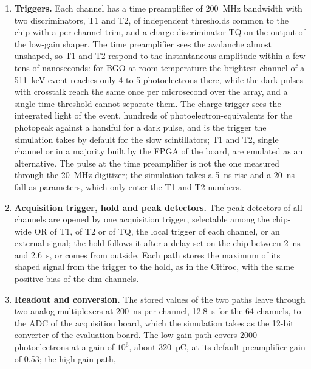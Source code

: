 \documentclass[11pt]{article}
\newcommand{\us}{\textmu s\xspace}
\begin{document}
\begin{enumerate}
  neither the capacitance nor the shaping time attached, allows up to
  about 0.7 photoelectron once scaled to the 2~nF of our device. The
  simulation assumes 0.1 photoelectron rms at 100~ns, scaled as
  $(100~\mathrm{ns}/t_p)^{1/2}$, until the bench measures it; the dark
  pulses, which the model generates explicitly, grow instead with the
  peaking time.
\item {\bf Triggers.} Each channel has a time preamplifier of 200~MHz
  bandwidth with two discriminators, T1 and T2, of independent thresholds
  common to the chip with a per-channel trim, and a charge discriminator TQ
  on the output of the low-gain shaper. The time preamplifier sees the
  avalanche almost unshaped, so T1 and T2 respond to the instantaneous
  amplitude within a few tens of nanoseconds: for BGO at room temperature the brightest
  channel of a 511~keV event reaches only 4 to 5 photoelectrons there,
  while the dark pulses with crosstalk reach the same once per microsecond
  over the array, and a single time threshold cannot separate them. The
  charge trigger sees the integrated light of the event, hundreds of
  photoelectron-equivalents for the photopeak against a handful for a dark
  pulse, and is the trigger the simulation takes by default for the slow
  scintillators; T1 and T2, single channel or in a majority built by the
  FPGA of the board, are emulated as an alternative. The pulse at the time
  preamplifier is not the one measured through the 20~MHz digitizer; the
  simulation takes a 5~ns rise and a 20~ns fall as parameters, which only
  enter the T1 and T2 numbers.
\item {\bf Acquisition trigger, hold and peak detectors.} The peak detectors
  of all channels are opened by one acquisition trigger, selectable among the
  chip-wide OR of T1, of T2 or of TQ, the local trigger of each channel, or
  an external signal; the hold follows it after a delay set on the chip
  between 2~ns and 2.6~\us, or comes from outside. Each path stores the
  maximum of its shaped signal from the trigger to the hold, as in the
  Citiroc, with the same positive bias of the dim channels.
\item {\bf Readout and conversion.} The stored values of the two paths
  leave through two analog multiplexers at 200~ns per channel, 12.8~\us
  for the 64 channels, to the ADC of the acquisition board, which the
  simulation takes as the 12-bit converter of the evaluation board. The
  low-gain path covers 2000 photoelectrons at a gain of $10^6$, about
  320~pC, at its default preamplifier gain of 0.53; the high-gain path,

\end{enumerate}
\end{document}
